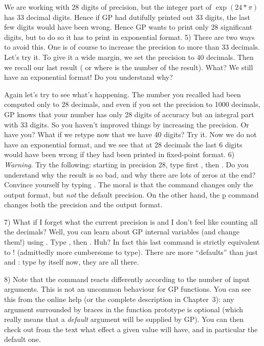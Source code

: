 We are working with 28 digits of precision, but the integer part of
$\exp(24*\pi)$ has 33 decimal digits. Hence if GP had dutifully printed out 33
digits, the last few digits would have been wrong. Hence GP wants to print only
28 significant digits, but to do so it has to print in exponential format.
\smallskip
%
5) There are two ways to avoid this. One is of course to increase the precision
to more than 33 decimals. Let's try it. To give it a wide margin, we set the
precision to 40 decimals. Then we recall our last result (\kbd{\%}
or  where  is the number of the result). What? We still have
an exponential format! Do you understand why?

Again let's try to see what's happening. The number you recalled had been
computed only to 28 decimals, and even if you set the precision to 1000
decimals, GP knows that your number has only 28 digits of accuracy but an
integral part with 33 digits. So you haven't improved things by increasing
the precision. Or have you? What if we retype  now that we
have 40 digits? Try it. Now we do not have an exponential format, and we see
that at 28 decimals the last 6 digits would have been wrong if they had been
printed in fixed-point format.
\smallskip
%
6) {\it Warning\/}. Try the following: starting in precision 28, type first
, then . Do you understand why
the result is so bad, and why there are lots of zeros at the end?  Convince
yourself by typing . The moral is that the
 command changes only the output format, but {\it not\/}
the default precision.  On the other hand, the \b{p} command changes both the
precision and the output format.

7) What if I forget what the current precision is and I don't feel like
counting all the decimals? Well, you can learn about GP internal variables
(and change them!) using . Type ,
then . Huh? In fact this last command is
strictly equivalent to ! (admittedly more cumbersome to type).
There are more ``defaults'' than just  and :
type  by itself now, they are all there.

8) Note that the  command reacts differently according to the
number of input arguments. This is not an uncommon behaviour for GP functions.
You can see this from the online help (or the complete description in
Chapter~3): any argument surrounded by braces \kbd{\obr\cbr} in the function
prototype is optional (which really means that a {\it default} argument will be
supplied by GP). You can then check out from the text what effect a given value
will have, and in particular the default one.

